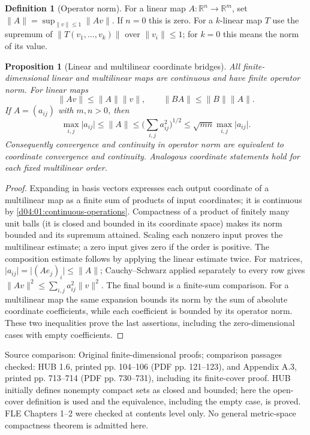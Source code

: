 \documentclass[11pt,oneside,openany]{book}
\newtheorem{proposition}[theorem]{Proposition}
\theoremstyle{definition}
\newtheorem{definition}[theorem]{Definition}
\theoremstyle{remark}
\newcommand{\R}{\mathbb R}
\newcommand{\abs}[1]{\lvert#1\rvert}
\newcommand{\norm}[1]{\lVert#1\rVert}
\newcommand{\source}[1]{\par\begingroup\small\sffamily\color{black!65}Source comparison: #1\par\endgroup}
\begin{document}
\begin{definition}[Operator norm]\label{d04:01:operator-norm}
For a linear map $A:\R^n\to\R^m$, set
$\norm{A}=\sup_{\norm{v}\leq1}\norm{Av}$. If $n=0$ this is zero.
For a $k$-linear map $T$ use the supremum of $\norm{T(v_1,\ldots,v_k)}$
over $\norm{v_i}\leq1$; for $k=0$ this means the norm of its value.
\end{definition}

\begin{proposition}[Linear and multilinear coordinate bridges]\label{d04:01:operator-estimates}
All finite-dimensional linear and multilinear maps are continuous and have
finite operator norm. For linear maps
\[
 \norm{Av}\leq\norm{A}\norm{v},\qquad
 \norm{BA}\leq\norm{B}\norm{A}.
\]
If $A=(a_{ij})$ with $m,n>0$, then
\[
 \max_{i,j}\abs{a_{ij}}\leq\norm{A}
 \leq\Big(\sum_{i,j}a_{ij}^2\Big)^{1/2}
 \leq\sqrt{mn}\max_{i,j}\abs{a_{ij}}.
\]
Consequently convergence and continuity in operator norm are equivalent to
coordinate convergence and continuity. Analogous coordinate statements hold
for each fixed multilinear order.
\end{proposition}
\begin{proof}
Expanding in basis vectors expresses each output coordinate of a multilinear
map as a finite sum of products of input coordinates; it is continuous by
\cref{d04:01:continuous-operations}. Compactness of a product of finitely many
unit balls (it is closed and bounded in its coordinate space) makes its norm
bounded and its supremum attained. Scaling each nonzero input proves the
multilinear estimate; a zero input gives zero if the order is positive.
The composition estimate follows by applying the linear estimate twice.
For matrices, $\abs{a_{ij}}=\abs{(Ae_j)_i}\leq\norm{A}$;
Cauchy--Schwarz applied separately to every row gives
$\norm{Av}^2\leq\sum_{i,j}a_{ij}^2\norm{v}^2$. The final bound is a
finite-sum comparison. For a multilinear map the same expansion bounds its
norm by the sum of absolute coordinate coefficients, while each coefficient
is bounded by its operator norm. These two inequalities prove the last
assertions, including the zero-dimensional cases with empty coefficients.
\end{proof}

\source{Original finite-dimensional proofs; comparison passages checked:
HUB 1.6, printed pp. 104--106 (PDF pp. 121--123), and Appendix A.3,
printed pp. 713--714 (PDF pp. 730--731), including its finite-cover proof.
HUB initially defines nonempty compact sets as closed and bounded; here
the open-cover definition is used and the equivalence, including the empty
case, is proved. FLE Chapters 1--2 were checked at contents level only.
No general metric-space compactness theorem is admitted here.}
\end{document}
